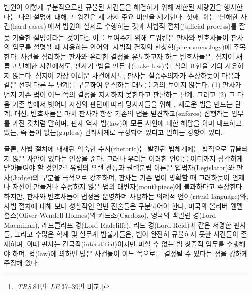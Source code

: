 법원이 이렇게 부분적으로만 규율된 사건들을 해결하기 위해 제한된 재량권을
행사한다는 나의 설명에 대해, 드워킨은 세 가지 주요 비판을 제기한다.
첫째, 이는 `난해한 사건(hard cases)'에서 법원이 실제로 수행하는 것과
사법적 절차(judicial process)를 잘못 기술한 설명이라는
것이다\footnote{{[}\emph{TRS} 81면; \emph{LE} 37--39면 비교.{]}}. 이를
보여주기 위해 드워킨은 판사와 변호사들이 판사의 임무를 설명할 때
사용하는 언어와, 사법적 결정의 현상학(phenomenology)에 주목한다. 사건을
심리하는 판사와 유리한 결정을 유도하고자 하는 변호사들은, 심지어 새롭고
난해한 사건에서도, 판사가 `법을 만든다(make law)'는 식의 표현을 거의
사용하지 않는다. 심지어 가장 어려운 사건에서도, 판사는 실증주의자가
주장하듯이 다음과 같은 전혀 다른 두 단계를 구분하여 인식하는 태도를 거의
보이지 않는다. (1) 판사가 먼저 기존 법이 어느 쪽의 결정을 지시하지
못한다고 판단하는 단계, 그리고 (2) 그 다음 기존 법에서 벗어나 자신의
판단에 따라 당사자들을 위해 ,
 새로운 법을 만드는 단계. 대신, 변호사들은 마치
판사가 항상 기존의 법을 발견하고(enforce) 집행하는 임무를 가진 것처럼
말하며, 판사 역시 법(law)이 모든 사안에 대한 해답을 이미 내포하고 있는,
즉 틈이 없는(gapless) 권리체계로 구성되어 있다고 말하는 경향이 있다.

물론, 사법 절차에 내재된 익숙한 수사(rhetoric)는 발전된 법체계에는
법적으로 규율되지 않은 사안이 없다는 인상을 준다. 그러나 우리는 이러한
언어를 어디까지 심각하게 받아들여야 할 것인가? 유럽의 오랜 전통과
권력분립 이론은 입법자(Legislator)와 판사(Judge)의 구분을 극적으로
강조하며, 판사는 기존 법이 명확할 때 그러하듯이 언제나 자신이 만들거나
수정하지 않은 법의 대변자(mouthpiece)에 불과하다고 주장한다. 하지만,
판사와 변호사들이 법정을 운영하며 사용하는 의례적 언어(ritual
language)와, 사법 절차에 대해 보다 성찰적인 일반 진술들은 구분되어야
한다. 미국의 올리버 웬델 홈스(Oliver Wendell Holmes)와 카드조(Cardozo),
영국의 맥밀런 경(Lord Macmillan), 래드클리프 경(Lord Radcliffe), 리드
경(Lord Reid)과 같은 저명한 판사들, 그리고 수많은 학계 및 실무계
법률가들은, 법이 완전히 규율하지 못한 사건들이 존재하며, 이때 판사는
간극적(interstitial)이지만 피할 수 없는 법 창출적 임무를 수행해야 하며,
법(law)에 의하면 많은 사건들이 어느 쪽으로든 결정될 수 있다는 점을
강하게 주장해 왔다.

